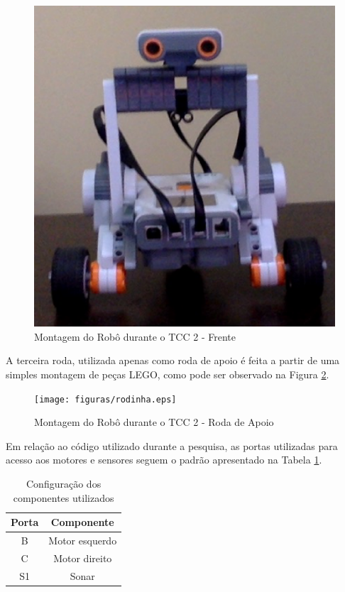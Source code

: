 	\begin{figure}[H]
		\centering
		\includegraphics[scale=0.7]{figuras/frente.eps}
		\caption[Montagem do Robô 2]{Montagem do Robô durante o TCC 2 - Frente}
		\label{img:img:montagem_robo}
	\end{figure}

	A terceira roda, utilizada apenas como roda de apoio é feita a partir de uma simples montagem de peças LEGO, como pode ser observado na Figura \ref{img:montagem_robo_costas}.

	\begin{figure}[H]
		\centering
		\texttt{[image: figuras/rodinha.eps]}
		\caption[Montagem do Robô 3]{Montagem do Robô durante o TCC 2 - Roda de Apoio}
		\label{img:montagem_robo_costas}
	\end{figure}

	Em relação ao código utilizado durante a pesquisa, as portas utilizadas para acesso aos motores e sensores seguem o padrão apresentado na Tabela \ref{tab:portas_motores_sensores}.

	\begin{table}[H]
		\centering
		\caption{Configuração dos componentes utilizados}
		\label{tab:portas_motores_sensores}
		\begin{tabular}{|c|c|}
		\hline
		\textbf{Porta} & \textbf{Componente} \\ \hline
		B              & Motor esquerdo      \\ \hline
		C              & Motor direito       \\ \hline
		S1             & Sonar               \\ \hline
		\end{tabular}
	\end{table}

